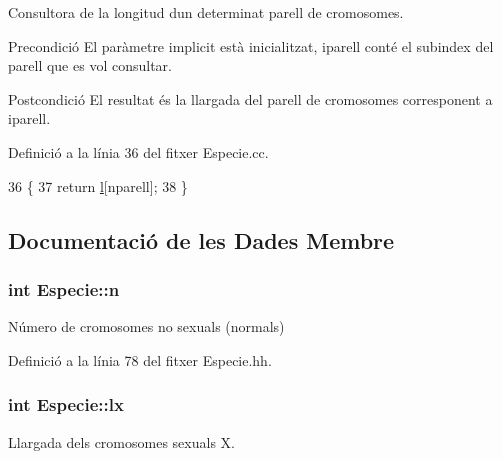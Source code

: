 Consultora de la longitud d\textquotesingle{}un determinat parell de cromosomes. 

\begin{DoxyPrecond}{Precondició}
El paràmetre implicit està inicialitzat, iparell conté el subindex del parell que es vol consultar. 
\end{DoxyPrecond}
\begin{DoxyPostcond}{Postcondició}
El resultat és la llargada del parell de cromosomes corresponent a iparell. 
\end{DoxyPostcond}


Definició a la línia 36 del fitxer Especie.\+cc.


\begin{DoxyCode}
36                                            \{
37     \textcolor{keywordflow}{return} \hyperlink{class_especie_ae32ed22b56d80f11c181911c67fa0e95}{l}[nparell];
38 \}
\end{DoxyCode}


\subsection{Documentació de les Dades Membre}
\subsubsection[{\texorpdfstring{n}{n}}]{\setlength{\rightskip}{0pt plus 5cm}int Especie\+::n\hspace{0.3cm}{\ttfamily [private]}}\hypertarget{class_especie_af4f592eef7e2135e6ddfe8bbc9b2aabf}{}\label{class_especie_af4f592eef7e2135e6ddfe8bbc9b2aabf}


Número de cromosomes no sexuals (normals) 



Definició a la línia 78 del fitxer Especie.\+hh.

\subsubsection[{\texorpdfstring{lx}{lx}}]{\setlength{\rightskip}{0pt plus 5cm}int Especie\+::lx\hspace{0.3cm}{\ttfamily [private]}}\hypertarget{class_especie_ade4c4e0e145af39d14078b08b3b03df8}{}\label{class_especie_ade4c4e0e145af39d14078b08b3b03df8}


Llargada dels cromosomes sexuals X. 



